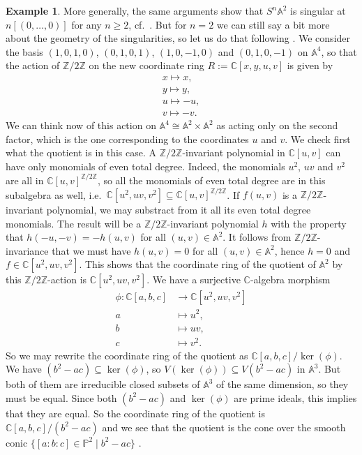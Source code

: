 \documentclass[12pt,a4paper]{amsart}
\theoremstyle{plain}
\theoremstyle{definition}
\newtheorem{exmp}[thm]{Example}
\theoremstyle{remark}
\begin{document}
\begin{exmp}
  More generally, the same arguments show that $S^{n}\mathbb{A}^{2}$ is singular at $n[(0,\ldots,0)]$ for any $n \geq 2$, cf.~\cite[Example 3.5]{rot16}.
  But for $n = 2$ we can still say a bit more about the geometry of the singularities, so let us do that following \cite[Example 3.6]{rot16}.
  We consider the basis $(1, 0, 1, 0)$, $(0, 1, 0, 1)$, $(1, 0, -1, 0)$ and $(0, 1, 0, -1)$ on $\mathbb{A}^{4}$, so that the action of $\mathbb{Z}/2\mathbb{Z}$ on the new coordinate ring $R := \mathbb{C}[x, y, u, v]$ is given by
  \begin{align*}
    x \mapsto x, \\
    y \mapsto y, \\
    u \mapsto -u, \\
    v \mapsto -v.
  \end{align*}
  We can think now of this action on $\mathbb{A}^{4} \cong \mathbb{A}^{2} \times \mathbb{A}^{2}$ as acting only on the second factor, which is the one corresponding to the coordinates $u$ and $v$.
  We check first what the quotient is in this case.
  A $\mathbb{Z}/2\mathbb{Z}$-invariant polynomial in $\mathbb{C}[u,v]$ can have only monomials of even total degree.
  Indeed, the monomials $u^{2}$, $uv$ and $v^{2}$ are all in $\mathbb{C}[u,v]^{\mathbb{Z}/2\mathbb{Z}}$, so all the monomials of even total degree are in this subalgebra as well, i.e.~$\mathbb{C}[u^{2}, uv, v^{2}] \subseteq \mathbb{C}[u,v]^{\mathbb{Z}/2\mathbb{Z}}$.
  If $f(u,v)$ is a $\mathbb{Z}/2\mathbb{Z}$-invariant polynomial, we may substract from it all its even total degree monomials.
  The result will be a $\mathbb{Z}/2\mathbb{Z}$-invariant polynomial $h$ with the property that $h(-u,-v) = -h(u,v)$ for all $(u, v) \in \mathbb{A}^{2}$.
  It follows from $\mathbb{Z}/2\mathbb{Z}$-invariance that we must have $h(u,v) = 0$ for all $(u, v) \in \mathbb{A}^{2}$, hence $h = 0$ and $f \in \mathbb{C}[u^{2},uv,v^{2}]$.
  This shows that the coordinate ring of the quotient of $\mathbb{A}^{2}$ by this $\mathbb{Z}/2\mathbb{Z}$-action is $\mathbb{C}[u^{2}, uv, v^{2}]$.
  We have a surjective $\mathbb{C}$-algebra morphism
  \begin{align*}
    \phi \colon \mathbb{C}[a,b,c] & \longrightarrow \mathbb{C}[u^{2}, uv, v^{2}] \\
    a & \longmapsto u^{2}, \\
    b & \longmapsto uv, \\
    c & \longmapsto v^{2}.
  \end{align*}
  So we may rewrite the coordinate ring of the quotient as $\mathbb{C}[a,b,c]/\ker(\phi)$.
  We have $(b^{2} - ac) \subseteq \ker(\phi)$, so $V(\ker(\phi)) \subseteq V(b^{2} - ac)$ in $\mathbb{A}^{3}$.
  But both of them are irreducible closed subsets of $\mathbb{A}^{3}$ of the same dimension, so they must be equal.
  Since both $(b^{2} - ac)$ and $\ker(\phi)$ are prime ideals, this implies that they are equal.
  So the coordinate ring of the quotient is $\mathbb{C}[a,b,c]/(b^{2} - ac)$ and we see that the quotient is the cone over the smooth conic $\{ [a:b:c] \in \mathbb{P}^{2} \mid b^{2} - ac \}$ \cite[Exercise I.2.10]{har77}.
  

\end{exmp}
\end{document}
